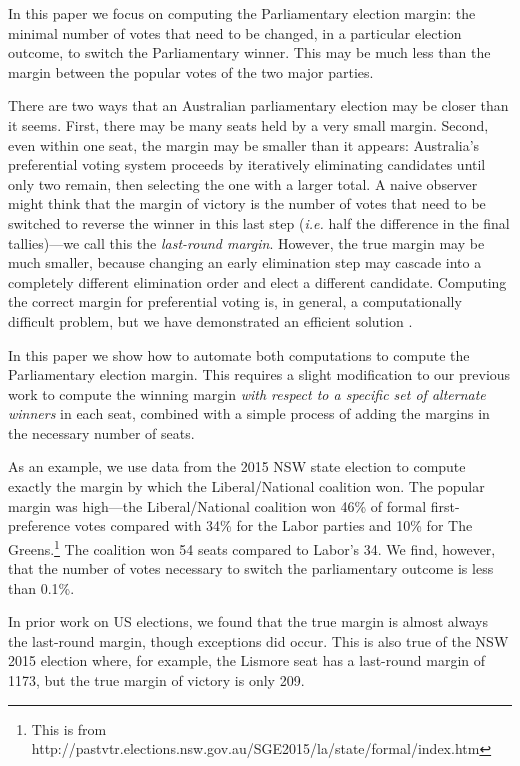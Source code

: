 \documentclass{article}
\begin{document}
In this paper we focus on computing the Parliamentary election margin: the minimal number of votes that need to be changed, in a particular election outcome, to switch the Parliamentary winner.  This may be much less than the margin between the popular votes of the two major parties.

There are two ways that an Australian parliamentary election may be closer than it seems.  First, there may be many seats held by a very small margin.  Second, even within one seat, the margin may be smaller than it appears: Australia's preferential voting system proceeds by iteratively eliminating candidates until only two remain, then selecting the one with a larger total.  A naive observer might think that the margin of victory is the number of votes that need to be switched to reverse the winner in this last step ({\it i.e.} half the difference in the final tallies)---we call this the \emph{last-round margin}.  However, the true margin may be much smaller, because changing an early elimination step may cascade into a completely different elimination order and elect a different candidate.  Computing the correct margin for preferential voting is, in general, a computationally difficult problem, but we have demonstrated an efficient solution \citep{blom16}.  

In this paper we show how to automate both computations to compute the  Parliamentary election margin.  This requires a slight modification to our previous work to compute the winning margin \emph{with respect to a specific set of alternate winners} in each seat, combined with a simple process of adding the margins in the necessary number of seats.
 
As an example, we use data from the 2015 NSW state election to compute exactly the margin by which the Liberal/National coalition won.  The popular margin was high---the Liberal/National coalition won 46\% of formal first-preference votes compared with 34\% for the Labor parties and 10\% for The Greens.\footnote{This is from http://pastvtr.elections.nsw.gov.au/SGE2015/la/state/formal/index.htm}  The coalition won 54 seats compared to Labor's 34.  We find, however, that the number of votes necessary to switch the parliamentary outcome is less than 0.1\%. 

In prior work on US elections, we found that the true margin is almost always the last-round margin, though exceptions did occur.  
This is also true of the NSW 2015 election where, for example, 
the Lismore seat has a last-round margin of 1173, but the true margin of victory is only 209. 
\end{document}
